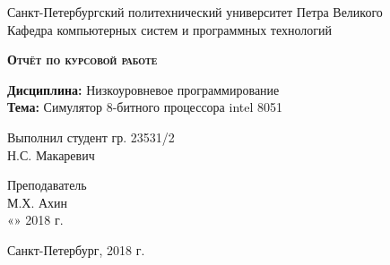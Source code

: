 \begin{titlepage}
  \begin{center}
    \large
    Санкт-Петербургский политехнический университет Петра Великого\\
    Кафедра компьютерных систем и программных технологий
    
    \vfill
 
    \textsc{\bf \LARGE Отчёт по курсовой работе}\\[5mm]
     
    {
    
    \Large {\bf Дисциплина:} Низкоуровневое программирование\\[2mm]
    {\bf Тема:} Симулятор 8-битного процессора intel 8051 
    
    }
  \bigskip
     
\end{center}
\vfill
 
\newlength{\ML}
\hfill\begin{minipage}{0.4\textwidth}
  Выполнил студент гр. 23531/2\\
  \underline{\hspace{\ML}} Н.С. Макаревич\\
\end{minipage}
\bigskip
 
\hfill\begin{minipage}{0.4\textwidth}
  Преподаватель\\
  \underline{\hspace{\ML}} М.Х. Ахин\\
  «\underline{\hspace{0.7cm}}» \underline{\hspace{2cm}} 2018 г.
\end{minipage}%
\vfill
 
\begin{center}
  Санкт-Петербург, 2018 г.
\end{center}
\end{titlepage}
